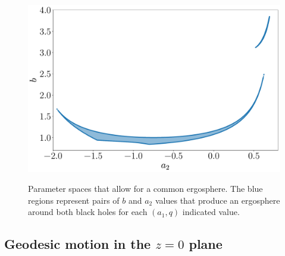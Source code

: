 \begin{figure}
{    \includegraphics[scale = 0.22]{img/penrose_binaries/cmmr_joined_ergo/joined_ergo_2_a1_1.5_q_0.5.pdf}
    \label{ch:penrose_binaries/fig:ergo_joined_2_c}
  }
  \caption{Parameter spaces that allow for a common ergosphere. The blue regions represent pairs of $b$ and $a_2$ values that produce an ergosphere around both black holes for each $(a_1,q)$ indicated value.}
  \label{ch:penrose_binaries/fig:ergo_joined_2}
\end{figure}

\subsection{Geodesic motion in the $z=0$ plane}

